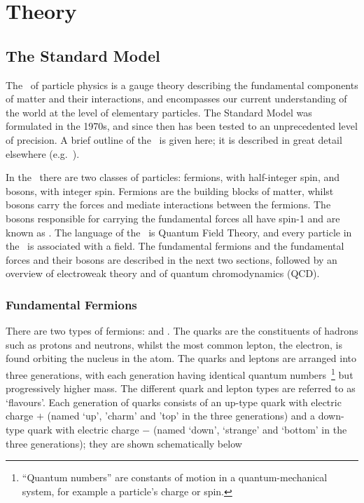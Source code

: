 \graphicspath{{Chapters/Theory/Figures/}}
\chapter{Theory}
\label{chap:Theory}

\section{The Standard Model}

The \sm\ of particle physics is a gauge theory describing the
fundamental components of matter and their interactions, and encompasses our
current understanding of the world at the level of elementary particles. The Standard Model was
formulated in the 1970s, and since then has been tested to an unprecedented
level of precision. %
A brief outline of the \sm\ is given here; it is described in great detail
elsewhere (e.g.~\cite{ALTARELLI:2005zv,cottingham2007introduction,ralnotes}).

In the \sm\ there are two classes of particles: fermions, with half-integer
spin, and bosons, with integer spin. Fermions are the building blocks of matter,
whilst bosons carry the forces and mediate interactions between the
fermions. The bosons responsible for carrying the fundamental forces all have
spin-1 and are known as .
The language of the \sm\ is Quantum Field Theory, and every particle in the \sm\
is associated with a field. The fundamental fermions and the fundamental forces
and their bosons are described in the next two sections, followed by an overview
of electroweak theory and of quantum chromodynamics (QCD).

\subsection{Fundamental Fermions}

There are two types of fermions:  and . The quarks are the
constituents of hadrons such as protons and neutrons, whilst the most common
lepton, the electron, is found orbiting the nucleus in the atom. 
The quarks and leptons are arranged into three generations, with each
generation having identical quantum numbers~\footnote{``Quantum numbers'' are
constants of motion in a quantum-mechanical system, for example a particle's charge or
spin.} but progressively higher mass. The
different quark and lepton types are referred to as `flavours'. Each
generation of quarks consists of an up-type quark with electric charge
$+$\nicefrac{2}{3}
(named `up', 'charm' and 'top' in the three generations) and a down-type quark
with electric charge $-$\nicefrac{1}{3} (named `down', `strange' and `bottom' in the three
generations); they are shown schematically below

